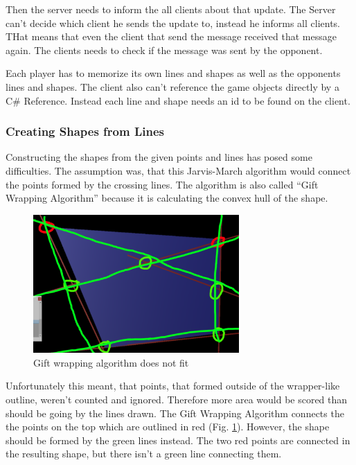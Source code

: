 Then the server needs to inform the all clients about that update. The Server can’t decide which client he sends the update to, instead he informs all clients. THat means that even the client that send the message received that message again. The clients needs to check if the message was sent by the opponent.

Each player has to memorize its own lines and shapes as well as the opponents lines and shapes. The client also can’t reference the game objects directly by a C\# Reference. Instead each line and shape needs an id to be found on the client.

\subsubsection{Creating Shapes from Lines}


Constructing the shapes from the given points and lines has posed some difficulties. 
The assumption was, that this Jarvis-March algorithm would connect the points formed by the crossing lines. The algorithm is also called ``Gift Wrapping Algorithm'' because it is calculating the convex hull of the shape.

\begin{figure}[htbp]
	\centering
		\includegraphics[width=0.70\textwidth]{img/ConnectLinesToShape.png}
	\caption[Gift wrapping algorithm does not fit]{Gift wrapping algorithm does not fit}
	\label{fig:ConnectLinesToShape}
\end{figure}

Unfortunately this meant, that points, that formed outside of the wrapper-like outline, weren’t counted and ignored. Therefore more area would be scored than should be going by the lines drawn. The Gift Wrapping Algorithm connects the the points on the top which are outlined in red (Fig. \ref{fig:ConnectLinesToShape}). However, the shape should be formed by the green lines instead. The two red points are connected in the resulting shape, but there isn’t a green line connecting them.



